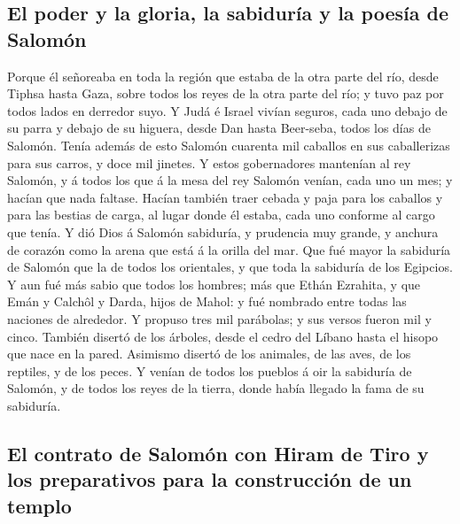 \hypertarget{el-poder-y-la-gloria-la-sabiduruxeda-y-la-poesuxeda-de-salomuxf3n}{%
\subsection{El poder y la gloria, la sabiduría y la poesía de
Salomón}\label{el-poder-y-la-gloria-la-sabiduruxeda-y-la-poesuxeda-de-salomuxf3n}}

 Porque él señoreaba en toda la región que estaba de la
otra parte del río, desde Tiphsa hasta Gaza, sobre todos los reyes de la
otra parte del río; y tuvo paz por todos lados en derredor suyo.
 Y Judá é Israel vivían seguros, cada uno debajo de su
parra y debajo de su higuera, desde Dan hasta Beer-seba, todos los días
de Salomón.  Tenía además de esto Salomón cuarenta mil
caballos en sus caballerizas para sus carros, y doce mil jinetes.
 Y estos gobernadores mantenían al rey Salomón, y á todos
los que á la mesa del rey Salomón venían, cada uno un mes; y hacían que
nada faltase.  Hacían también traer cebada y paja para
los caballos y para las bestias de carga, al lugar donde él estaba, cada
uno conforme al cargo que tenía.  Y dió Dios á Salomón
sabiduría, y prudencia muy grande, y anchura de corazón como la arena
que está á la orilla del mar.  Que fué mayor la sabiduría
de Salomón que la de todos los orientales, y que toda la sabiduría de
los Egipcios.  Y aun fué más sabio que todos los hombres;
más que Ethán Ezrahita, y que Emán y Calchôl y Darda, hijos de Mahol: y
fué nombrado entre todas las naciones de alrededor.  Y
propuso tres mil parábolas; y sus versos fueron mil y cinco.
 También disertó de los árboles, desde el cedro del
Líbano hasta el hisopo que nace en la pared. Asimismo disertó de los
animales, de las aves, de los reptiles, y de los peces. 
Y venían de todos los pueblos á oir la sabiduría de Salomón, y de todos
los reyes de la tierra, donde había llegado la fama de su sabiduría.

\hypertarget{el-contrato-de-salomuxf3n-con-hiram-de-tiro-y-los-preparativos-para-la-construcciuxf3n-de-un-templo}{%
\subsection{El contrato de Salomón con Hiram de Tiro y los preparativos
para la construcción de un
templo}\label{el-contrato-de-salomuxf3n-con-hiram-de-tiro-y-los-preparativos-para-la-construcciuxf3n-de-un-templo}}

